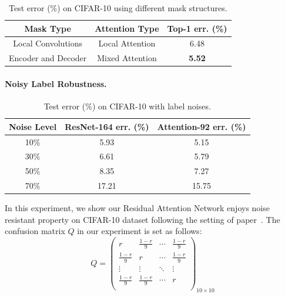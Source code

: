 \documentclass[10pt,twocolumn,letterpaper]{article}
\begin{document}
\begin{table}[h]\small
\setlength{\abovecaptionskip}{0pt}
\begin{center}
\begin{tabular}{c|c|c} \hline
Mask Type  & Attention Type &Top-1 err. (\%) \\
\hline
Local Convolutions & Local Attention &6.48 \\
\hline
Encoder and Decoder  & Mixed Attention &\textbf{5.52}\\
\hline
\end{tabular}
\end{center}
\caption{Test error (\%) on CIFAR-10 using different mask structures.}
\label{tab:local_global_attention}
\end{table}


\paragraph{Noisy Label Robustness.}
\label{para:noise}

\begin{table}\small
\setlength{\abovecaptionskip}{0pt}
\setlength{\belowcaptionskip}{-10pt}
\begin{center}
\begin{tabular}{c|c|c} \hline
Noise Level &ResNet-164 err. (\%) & Attention-92 err. (\%) \\
\hline
10\% &5.93 &5.15\\
\hline
30\% &6.61 &5.79\\
\hline
50\% &8.35 &7.27\\
\hline
70\% &17.21 &15.75\\
\hline
\end{tabular}
\end{center}
\caption{Test error (\%) on CIFAR-10 with label noises.}
\label{tab:noise_label}
\end{table}
In this experiment, we show our Residual Attention Network enjoys noise resistant property on CIFAR-10 dataset following the setting of paper~\cite{sukhbaatar2014training}.
%
The confusion matrix $Q$ in our experiment is set as follows:
\begin{equation}
Q =
\left(
\begin{matrix}
r & \frac{1-r}{9} &\cdots &\frac{1-r}{9} \\
\frac{1-r}{9} &r  &\cdots &\frac{1-r}{9} \\
\vdots & \vdots & \ddots & \vdots \\
\frac{1-r}{9} & \frac{1-r}{9} &\cdots &r \\
\end{matrix}
\right)_{10\times 10}
\end{equation}
\end{document}
